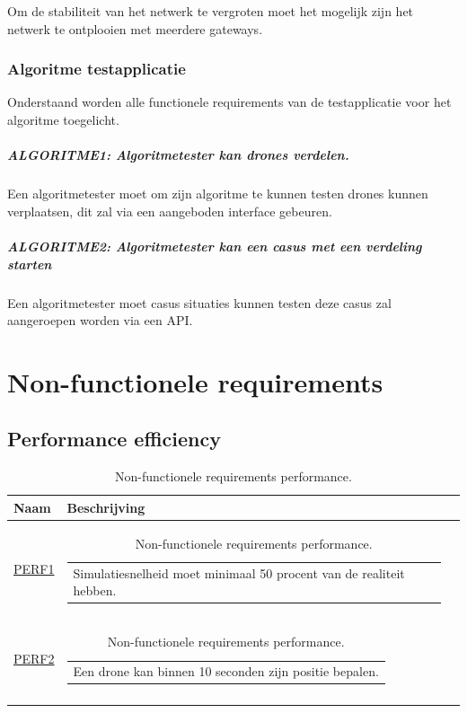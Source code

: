 \documentclass[a4paper, 11pt, oneside]{report}
\begin{document}
Om de stabiliteit van het netwerk te vergroten moet het mogelijk zijn het netwerk te ontplooien met meerdere gateways. 


\subsection{Algoritme testapplicatie}
Onderstaand worden alle functionele requirements van de testapplicatie voor het algoritme toegelicht.
\paragraph{ALGORITME1: Algoritmetester kan drones verdelen.}
\hypertarget{ALGORITME1}{}
Een algoritmetester moet om zijn algoritme te kunnen testen drones kunnen verplaatsen, dit zal via een aangeboden interface gebeuren.
\paragraph{ALGORITME2: Algoritmetester kan een casus met een verdeling starten}
\hypertarget{ALGORITME2}{}
Een algoritmetester moet casus situaties kunnen testen deze casus zal aangeroepen worden via een API. 

\chapter{Non-functionele requirements}
\section{Performance efficiency}

\begin{longtable}{|l|l|l|}
	\hline
	\rowcolor[HTML]{C0C0C0} 
	Naam & Beschrijving \\ \hline
	\endhead
	\hyperlink{PERF1}{PERF1}			&\begin{tabular}[c]{@{}l@{}}Simulatiesnelheid moet minimaal 50 procent van de realiteit hebben.	\end{tabular}\\ \hline
	\hyperlink{PERF2}{PERF2}			&\begin{tabular}[c]{@{}l@{}}Een drone kan binnen 10 seconden zijn positie bepalen.\end{tabular}\\ \hline
	\caption{Non-functionele requirements performance.}
	\label{tab:nietfunctionelecriteria:performance}
\end{longtable}
\end{document}
